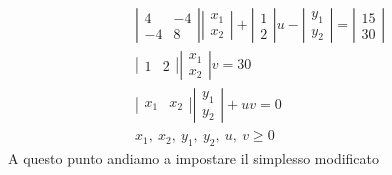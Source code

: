 \documentclass[12pt,a4paper]{article}
\begin{document}
\begin{equation*}\begin{array}{l}
\left|\begin{array}{cc} 4 & -4\\ -4 & 8\end{array}\right|\left|\begin{array}{c} x_1\\ x_2\end{array}\right| + \left|\begin{array}{c} 1\\ 2\end{array}\right|u- \left|\begin{array}{c} y_1\\ y_2\end{array}\right| = \left|\begin{array}{c} 15\\ 30\end{array}\right|\\
\left|\begin{array}{cc} 1 & 2\end{array}\right|\left|\begin{array}{c} x_1\\ x_2\end{array}\right|v = 30\\
\left|\begin{array}{cc} x_1 & x_2\end{array}\right|\left|\begin{array}{c} y_1\\ y_2\end{array}\right| + uv = 0\\
x_1,\ x_2,\ y_1,\ y_2,\ u,\ v \geq 0
\end{array} \end{equation*}
A questo punto andiamo a impostare il simplesso modificato
\begin{Parallel}{0.45 \textwidth}{0.45 \textwidth}
\end{Parallel}
\end{document}

